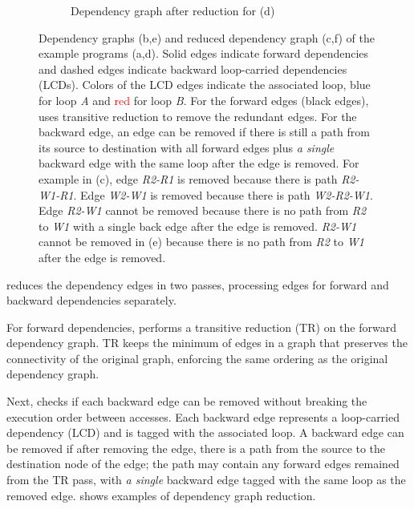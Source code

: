\begin{figure}
\begin{subfigure}[b]{0.3\textwidth}
\caption{
  Dependency graph after reduction for (d)
}
\end{subfigure}
\caption[Examples for dependency graph reduction]{
  Dependency graphs (b,e) and reduced dependency graph (c,f) of the example programs (a,d).
  Solid edges indicate forward dependencies and
  dashed edges indicate backward loop-carried dependencies (LCDs).
  Colors of the LCD edges indicate the associated loop, \textcolor{pureblue}{blue} for loop \emph{A} and
  \textcolor{red}{red} for loop \emph{B}.
  For the forward edges (black edges), \name uses transitive reduction to remove the redundant
  edges.
  For the backward edge, an edge can be removed if there is still a path from its source to
  destination with all forward edges plus \emph{a single} backward edge with the same loop after the edge is
  removed.
  For example in (c), edge \emph{R2-R1} is removed because there is path \emph{R2-W1-R1}.
  Edge \emph{W2-W1} is removed because there is path \emph{W2-R2-W1}. 
  Edge \emph{R2-W1} cannot be removed because there is no path from \emph{R2} to \emph{W1} with a
  single back edge after the edge is removed.
  \emph{R2-W1} cannot be
  removed in (e) because there is no path from \emph{R2} to \emph{W1} after the edge is removed.
}
\label{fig:graphred}
\end{figure}

\name reduces the dependency edges in two passes, processing edges for forward and
backward dependencies separately.

For forward dependencies, \name performs a transitive reduction (TR)\cite{tr} on the forward dependency
graph. TR keeps the minimum of edges in a graph that preserves the connectivity of the original
graph, enforcing the same ordering as the original dependency graph.

Next, \name checks if each backward edge can be removed without breaking the execution order between
accesses. 
Each backward edge represents a loop-carried dependency (LCD) and is tagged with the associated loop.
A backward edge can be removed if after removing the edge, there is a path from the source to the
destination node of the edge; the path may contain any forward edges remained from the TR pass,
with \emph{a single} backward edge tagged with the same loop as the removed edge.
 shows examples of dependency graph reduction.

